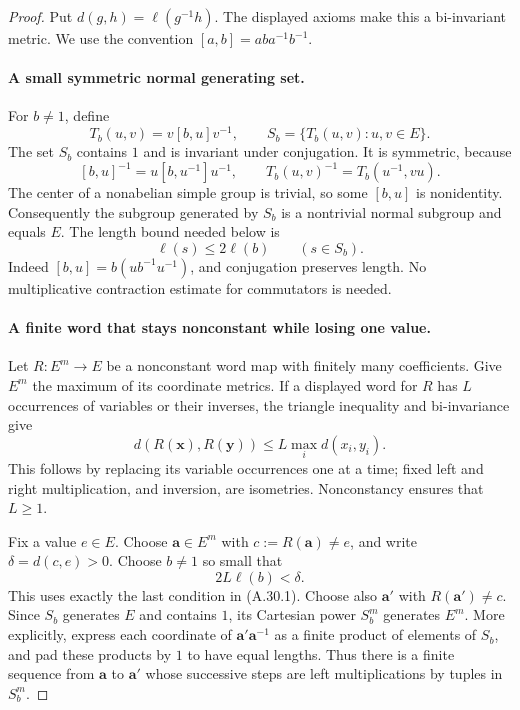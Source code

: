 \begin{proof}
Put $d(g,h)=\ell(g^{-1}h)$. The displayed axioms make this a
bi-invariant metric. We use the convention
$[a,b]=aba^{-1}b^{-1}$.

\paragraph{A small symmetric normal generating set.}
For $b\ne1$, define
\[
 T_b(u,v)=v[b,u]v^{-1},\qquad
 S_b=\{T_b(u,v):u,v\in E\}.
 \tag{A.30.3}
\]
The set $S_b$ contains $1$ and is invariant under conjugation.
It is symmetric, because
\[
 [b,u]^{-1}=u[b,u^{-1}]u^{-1},\qquad
 T_b(u,v)^{-1}=T_b(u^{-1},vu).
 \tag{A.30.4}
\]
The center of a nonabelian simple group is trivial, so some
$[b,u]$ is nonidentity. Consequently the subgroup generated
by $S_b$ is a nontrivial normal subgroup and equals $E$.
The length bound needed below is
\[
 \ell(s)\leq2\ell(b)\qquad(s\in S_b).
 \tag{A.30.5}
\]
Indeed $[b,u]=b(ub^{-1}u^{-1})$, and conjugation preserves
length. No multiplicative contraction estimate for
commutators is needed.

\paragraph{A finite word that stays nonconstant while losing one value.}
Let $R:E^m\to E$ be a nonconstant word map with finitely many
coefficients. Give $E^m$ the maximum of its coordinate metrics.
If a displayed word for $R$ has $L$ occurrences of variables
or their inverses, the triangle inequality and bi-invariance
give
\[
 d(R(\mathbf x),R(\mathbf y))
 \leq L\max_i d(x_i,y_i).
 \tag{A.30.6}
\]
This follows by replacing its variable occurrences one at a
time; fixed left and right multiplication, and inversion,
are isometries. Nonconstancy ensures that $L\geq1$.

Fix a value $e\in E$. Choose $\mathbf a\in E^m$ with
$c:=R(\mathbf a)\ne e$, and write $\delta=d(c,e)>0$.
Choose $b\ne1$ so small that
\[
 2L\ell(b)<\delta.
 \tag{A.30.7}
\]
This uses exactly the last condition in (A.30.1).
Choose also $\mathbf a'$ with $R(\mathbf a')\ne c$.
Since $S_b$ generates $E$ and contains $1$, its Cartesian
power $S_b^m$ generates $E^m$. More explicitly, express each
coordinate of $\mathbf a'\mathbf a^{-1}$ as a finite product
of elements of $S_b$, and pad these products by $1$ to have
equal lengths. Thus there is a finite sequence from
$\mathbf a$ to $\mathbf a'$ whose successive steps are left
multiplications by tuples in $S_b^m$.


\end{proof}
